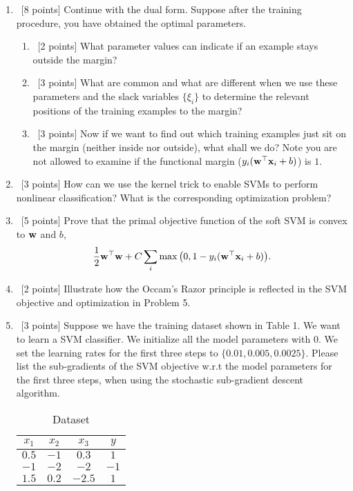 \documentclass[12pt, fullpage,letterpaper]{article}
\begin{document}
\begin{enumerate}
	\item~[8 points] Continue with the dual form. Suppose after the training procedure, you have obtained the optimal parameters.
	\begin{enumerate}
		\item~[2 points] What parameter values can indicate if an example stays outside the margin?
		\item~[3 points] What are common and what are different when we use these parameters and the slack variables $\{\xi_i\}$ to determine the relevant positions of the training examples to the margin?
		\item~[3 points] Now if we want to find out which training examples just sit on the margin (neither inside nor outside), what shall we do? Note you are not allowed to examine if the functional margin (\ie $y_i({\bf w}^\top{\bf x}_i +b)$) is $1$.
	\end{enumerate}
	
	
	\item~[3 points] How can we use the kernel trick to enable SVMs to perform nonlinear classification? What is the corresponding optimization problem?


	\item~[5 points] Prove that the primal objective function of the soft SVM is convex to ${\bf w}$ and $b$, 
	\[
	\frac{1}{2}{\bf w}^\top{\bf w} + C\sum_{i} \max\big(0, 1 - y_i({\bf w}^\top{\bf x}_i+b)\big).
	\]
	
	\item~[2 points] Illustrate how the Occam's Razor principle is reflected in the SVM objective and optimization in Problem 5. 
	
	
	\item~[3 points] Suppose we have the training dataset shown in Table 1. We want to learn a SVM classifier. We initialize all the model parameters with $0$. We set the learning rates for the first three steps to $\{0.01, 0.005, 0.0025\}$.  Please list the sub-gradients of the SVM objective w.r.t the model parameters for the first three steps, when using the stochastic sub-gradient descent algorithm. 
	\begin{table}[h]
		\centering
		\begin{tabular}{ccc|c}
			$x_1$ & $x_2$ & $x_3$ &  $y$\\ 
			\hline\hline
			$0.5$ & $-1$ & $0.3$ & $1$ \\ \hline
			$-1$ & $-2$ & $-2$ & $-1$\\ \hline
			$1.5$ & $0.2$ & $-2.5$ & $1$\\ \hline
		\end{tabular}
	\caption{Dataset}
	\end{table}


\end{enumerate}
\end{document}
